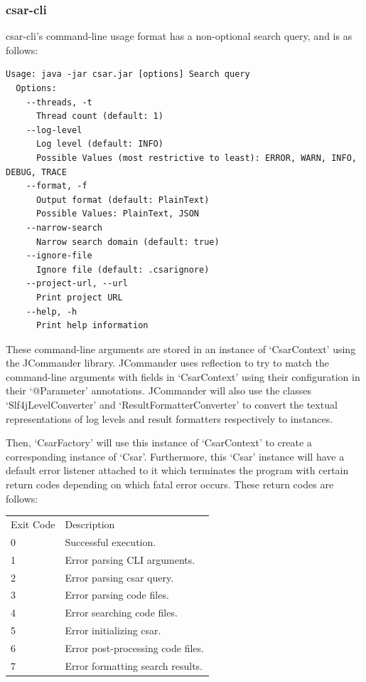 \documentclass[12pt, letterpaper]{article}
\begin{document}
\subsubsection{csar-cli}
csar-cli's command-line usage format has a non-optional search query, and is as follows:
\begin{lstlisting}
Usage: java -jar csar.jar [options] Search query
  Options:
    --threads, -t
      Thread count (default: 1)
    --log-level
      Log level (default: INFO)
      Possible Values (most restrictive to least): ERROR, WARN, INFO, DEBUG, TRACE
    --format, -f
      Output format (default: PlainText)
      Possible Values: PlainText, JSON
    --narrow-search
      Narrow search domain (default: true)
    --ignore-file
      Ignore file (default: .csarignore)
    --project-url, --url
      Print project URL
    --help, -h
      Print help information
\end{lstlisting}

These command-line arguments are stored in an instance of `CsarContext' using the JCommander library.
JCommander uses reflection to try to match the command-line arguments with fields in `CsarContext' using their configuration in their `@Parameter' annotations.
JCommander will also use the classes `Slf4jLevelConverter' and `ResultFormatterConverter' to convert the textual representations of log levels and result formatters respectively to instances.

Then, `CsarFactory' will use this instance of `CsarContext' to create a corresponding instance of `Csar'.
Furthermore, this `Csar' instance will have a default error listener attached to it which terminates the program with certain return codes depending on which fatal error occurs.
These return codes are follows:

\begin{tabular}{ l l }
  Exit Code & Description \\
  0 & Successful execution. \\
  1 & Error parsing CLI arguments. \\
  2 & Error parsing csar query. \\
  3 & Error parsing code files. \\
  4 & Error searching code files. \\
  5 & Error initializing csar. \\
  6 & Error post-processing code files. \\
  7 & Error formatting search results. \\
\end{tabular}
\end{document}
